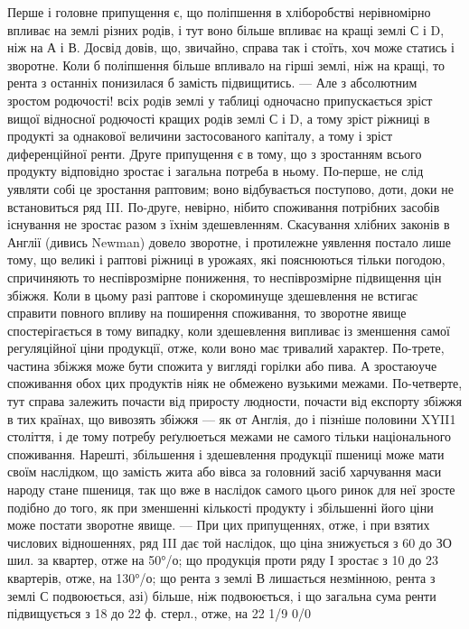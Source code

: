 Перше і головне припущення є, що поліпшення в хліборобстві нерівномірно
впливає на землі різних родів, і тут воно більше впливає на кращі землі
С і D, ніж на А і В. Досвід довів, що, звичайно, справа так і стоїть, хоч може
статись і зворотне. Коли б поліпшення більше впливало на гірші землі, ніж на
кращі, то рента з останніх понизилася б замість підвищитись. — Але з абсолютним
зростом родючості! всіх родів землі у таблиці одночасно припускається зріст
вищої відносної родючості кращих родів землі С і D, а тому зріст ріжниці в продукті за однакової
величини застосованого капіталу, а тому і зріст диференційної ренти.
Друге припущення є в тому, що з зростанням всього продукту відповідно зростає і загальна потреба в
ньому. По-перше, не слід уявляти собі це зростання раптовим; воно відбувається поступово, доти, доки
не встановиться ряд III.
По-друге, невірно, нібито споживання потрібних засобів існування не зростає разом з їхнім
здешевленням. Скасування хлібних законів в Англії (дивись Newman) довело зворотне, і протилежне
уявлення постало лише тому, що великі і раптові ріжниці в урожаях, які пояснюються тільки погодою,
спричиняють то неспіврозмірне пониження, то неспіврозмірне підвищення цін збіжжя.
Коли в цьому разі раптове і скороминуще здешевлення не встигає справити повного впливу на поширення
споживання, то зворотне явище спостерігається в тому випадку, коли здешевлення випливає із зменшення
самої регуляційної ціни продукції, отже, коли воно має тривалий характер. По-трете, частина збіжжя
може бути спожита у вигляді горілки або пива. А зростаюуче споживання обох цих продуктів ніяк не
обмежено вузькими межами. По-четверте, тут справа залежить почасти від приросту людности, почасти
від
експорту збіжжя в тих країнах, що вивозять збіжжя — як от Англія, до і
пізніше половини XYII1 століття, і де тому потребу реґулюеться межами не самого
тільки національного споживання. Нарешті, збільшення і здешевлення
продукції пшениці може мати своїм наслідком, що замість жита або вівса за
головний засіб харчування маси народу стане пшениця, так що вже в наслідок
самого цього ринок для неї зросте подібно до того, як при зменшенні кількості
продукту і збільшенні його ціни може постати зворотне явище. — При цих припущеннях, отже, і при
взятих числових відношеннях, ряд III дає той наслідок,
що ціна знижується з 60 до ЗО шил. за квартер, отже на 50°/о; що продукція проти ряду І зростає з 10
до 23 квартерів, отже, на 130°/о; що рента з землі В лишається незмінною, рента з землі С
подвоюється, азі) більше, ніж подвоюється, і що загальна сума ренти підвищується з 18 до 22 ф.
стерл., отже, на 22 1/9 0/0

